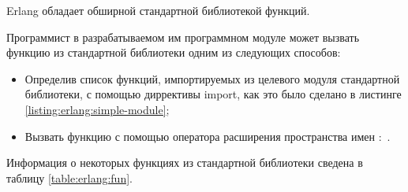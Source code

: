 
Erlang обладает обширной стандартной библиотекой функций.

Программист в разрабатываемом им программном модуле может вызвать функцию из стандартной библиотеки одним из следующих способов:

\begin{itemize}

	\item Определив список функций, импортируемых из целевого модуля стандартной библиотеки, с помощью диррективы import, как это было сделано в листинге \ref{listing:erlang:simple-module};
	\item Вызвать функцию с помощью оператора расширения пространства имен :~.

\end{itemize}

Информация о некоторых функциях из стандартной библиотеки сведена в таблицу \ref{table:erlang:fun}.

\newcommand{\elhead}[1]
{
	\multicolumn{6}{r}{Таблица~\thetable~---~Некоторые функции стандартной библиотеки~(#1)} \\
	\hline
	\multirow{2}{*}{\bf Функция} & \multicolumn{3}{c|}{\bf Параметры} & \multirow{2}{*}{\vbox{\centering \bf Возвращаемое \\ значение}} & \multirow{2}{*}{\bf Примечание} \\
	\cline{2-4}
	& \bf 1 & \bf 2 & \bf 3 && \\
	\hline
}

\newcommand{\elf}[6]{#1 & #2 & #3 & #4 & #5 & #6 \\}

